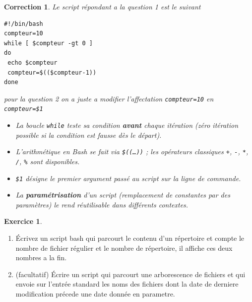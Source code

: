\documentclass[a4paper,11pt]{article}
\theoremstyle{plain}
\newtheorem{correction}{Correction}
\theoremstyle{definition}
\newtheorem{exercice}{Exercice}
\begin{document}
\begin{correction}
Le script  répondant a la question 1 est le suivant
\begin{lstlisting}
#!/bin/bash
compteur=10
while [ $compteur -gt 0 ]
do
 echo $compteur
 compteur=$(($compteur-1))
done
\end{lstlisting}
pour la question 2 on a juste a modifier l'affectation \texttt{compteur=10} en \texttt{compteur=\$1}

\begin{pointcle}
\begin{itemize}
    \item La boucle \texttt{while} teste sa condition \textbf{avant} chaque itération (zéro itération possible si la condition est fausse dès le départ).
    \item L'arithmétique en Bash se fait via \texttt{\$((\ldots))} ; les opérateurs classiques \texttt{+}, \texttt{-}, \texttt{*}, \texttt{/}, \texttt{\%} sont disponibles.
    \item \texttt{\$1} désigne le premier argument passé au script sur la ligne de commande.
    \item La \textbf{paramétrisation} d'un script (remplacement de constantes par des paramètres) le rend réutilisable dans différents contextes.
\end{itemize}
\end{pointcle}

\end{correction}


\begin{exercice}
\begin{enumerate}
\item \'Ecrivez un script bash qui parcourt le contenu d'un répertoire et compte le nombre de fichier régulier et le nombre de répertoire, il affiche ces deux nombres a la fin.
\item  (facultatif) \'Ecrire un script qui parcourt une arborescence de fichiers et qui envoie sur l'entrée standard  les noms  des fichiers dont la date de derniere modification précede une date donnée en parametre.
\end{enumerate}
\end{exercice}
\end{document}
